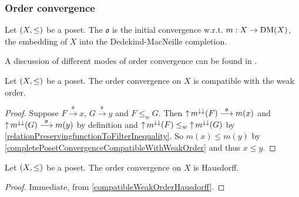 \subsubsection{Order convergence}
\begin{definition}
Let $\sSet{X,\leq}$ be a poset. The  $\mathfrak{o}$ is the initial convergence w.r.t. $m: X \to \operatorname{DM}(X)$, the embedding of $X$ into the Dedekind-MacNeille completion.
\end{definition}

A discussion of different modes of order convergence can be found in \cite{abela_different_2022}.

\begin{lemma} \label{orderConvergenceCompatibleWeakOrder}
Let $\sSet{X,\leq}$ be a poset. The order convergence on $X$ is compatible with the weak order.
\end{lemma}
\begin{proof}
Suppose $F\overset{\mathfrak{o}}{\longrightarrow} x$, $G\overset{\mathfrak{o}}{\longrightarrow} y$ and $F\leq_w G$. Then $\operatorname{\uparrow} m^{\downarrow\downarrow}(F) \overset{\mathfrak{o}}{\longrightarrow} m(x)$ and $\operatorname{\uparrow} m^{\downarrow\downarrow}(G) \overset{\mathfrak{o}}{\longrightarrow} m(y)$ by definition and $\operatorname{\uparrow} m^{\downarrow\downarrow}(F) \leq_w \operatorname{\uparrow} m^{\downarrow\downarrow}(G)$ by \ref{relationPreservingfunctionToFilterInequality}. So $m(x)\leq m(y)$ by \ref{completePosetConvergenceCompatibleWithWeakOrder} and thus $x\leq y$. 
\end{proof}
\begin{corollary} \label{orderConvergencePosetHausdorff}
Let $\sSet{X,\leq}$ be a poset. The order convergence on $X$ is Hausdorff.
\end{corollary}
\begin{proof}
Immediate, from \ref{compatibleWeakOrderHausdorff}.
\end{proof}


